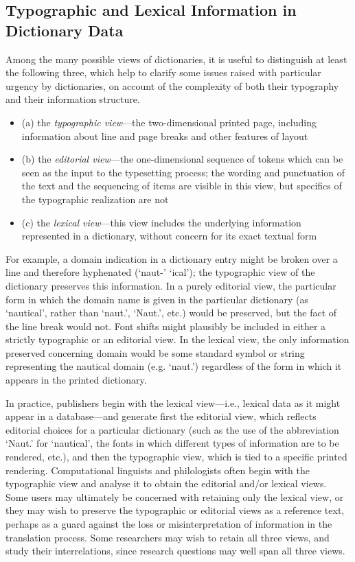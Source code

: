 \subsection[{Typographic and Lexical Information in Dictionary Data}]{Typographic and Lexical Information in Dictionary Data}\label{DIMV}\par
Among the many possible views of dictionaries, it is useful to distinguish at least the following three, which help to clarify some issues raised with particular urgency by dictionaries, on account of the complexity of both their typography and their information structure.\begin{itemize}
\item (a) the \textit{typographic view}—the two-dimensional printed page, including information about line and page breaks and other features of layout
\item (b) the \textit{editorial view}—the one-dimensional sequence of tokens which can be seen as the input to the typesetting process; the wording and punctuation of the text and the sequencing of items are visible in this view, but specifics of the typographic realization are not
\item (c) the \textit{lexical view}—this view includes the underlying information represented in a dictionary, without concern for its exact textual form
\end{itemize} \par
For example, a domain indication in a dictionary entry might be broken over a line and therefore hyphenated (‘naut-’ ‘ical’); the typographic view of the dictionary preserves this information. In a purely editorial view, the particular form in which the domain name is given in the particular dictionary (as ‘nautical’, rather than ‘naut.’, ‘Naut.’, etc.) would be preserved, but the fact of the line break would not. Font shifts might plausibly be included in either a strictly typographic or an editorial view. In the lexical view, the only information preserved concerning domain would be some standard symbol or string representing the nautical domain (e.g. ‘naut.’) regardless of the form in which it appears in the printed dictionary.\par
In practice, publishers begin with the lexical view—i.e., lexical data as it might appear in a database—and generate first the editorial view, which reflects editorial choices for a particular dictionary (such as the use of the abbreviation ‘Naut.’ for ‘nautical’, the fonts in which different types of information are to be rendered, etc.), and then the typographic view, which is tied to a specific printed rendering. Computational linguists and philologists often begin with the typographic view and analyse it to obtain the editorial and/or lexical views. Some users may ultimately be concerned with retaining only the lexical view, or they may wish to preserve the typographic or editorial views as a reference text, perhaps as a guard against the loss or misinterpretation of information in the translation process. Some researchers may wish to retain all three views, and study their interrelations, since research questions may well span all three views.\par
